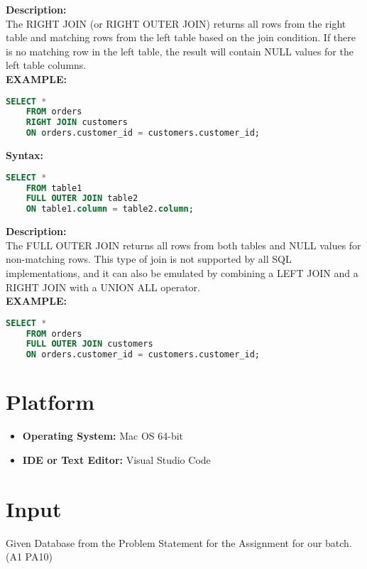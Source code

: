 \documentclass{article}
\begin{document}
\textbf{Description:}\\
The RIGHT JOIN (or RIGHT OUTER JOIN) returns all rows from the right table and matching rows from the left table based on the join condition. If there is no matching row in the left table, the result will contain NULL values for the left table columns.\\
\textbf{EXAMPLE:}
\begin{lstlisting}[language=SQL]
    SELECT *
    FROM orders
    RIGHT JOIN customers 
    ON orders.customer_id = customers.customer_id;

\end{lstlisting}
\textbf{Syntax:}
\begin{lstlisting}[language=SQL]
    SELECT * 
    FROM table1
    FULL OUTER JOIN table2 
    ON table1.column = table2.column;

\end{lstlisting}
\textbf{Description:}\\
The FULL OUTER JOIN returns all rows from both tables and NULL values for non-matching rows. This type of join is not supported by all SQL implementations, and it can also be emulated by combining a LEFT JOIN and a RIGHT JOIN with a UNION ALL operator.\\
\textbf{EXAMPLE:}
\begin{lstlisting}[language=SQL]
    SELECT *
    FROM orders
    FULL OUTER JOIN customers 
    ON orders.customer_id = customers.customer_id;

\end{lstlisting}
\section{\textbf{Platform}}
\begin{itemize}
    \item \textbf{Operating System:} Mac OS 64-bit
    \item \textbf{IDE or Text Editor:} Visual Studio Code
\end{itemize}
\section{\textbf{Input}}
Given Database from the Problem Statement for the Assignment for our batch. (A1 PA10)
\end{document}
